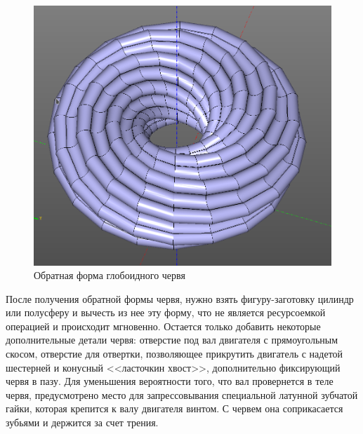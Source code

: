 \begin{figure}[h]
\centering
\includegraphics[width=0.8\linewidth]{./image/worm_tor}
\caption{Обратная форма глобоидного червя}
\end{figure}

После получения обратной формы червя, нужно взять фигуру-заготовку цилиндр или полусферу и вычесть из нее эту форму, что не является ресурсоемкой операцией и происходит мгновенно. Остается только добавить некоторые дополнительные детали червя: отверстие под вал двигателя с прямоугольным скосом, отверстие для отвертки, позволяющее прикрутить двигатель с надетой шестерней и конусный <<ласточкин хвост>>, дополнительно фиксирующий червя в пазу. Для уменьшения вероятности того, что вал провернется в теле червя, предусмотрено место для запрессовывания специальной латунной зубчатой гайки, которая крепится к валу двигателя винтом. С червем она соприкасается зубьями и держится за счет трения. 

